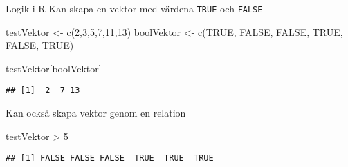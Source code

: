 \documentclass[
  10pt,
  ignorenonframetext,
]{beamer}
\newenvironment{Shaded}{\begin{snugshade}}{\end{snugshade}}
\newcommand{\ConstantTok}[1]{\textcolor[rgb]{0.00,0.00,0.00}{#1}}
\newcommand{\DecValTok}[1]{\textcolor[rgb]{0.00,0.00,0.81}{#1}}
\newcommand{\FunctionTok}[1]{\textcolor[rgb]{0.00,0.00,0.00}{#1}}
\newcommand{\NormalTok}[1]{#1}
\newcommand{\OtherTok}[1]{\textcolor[rgb]{0.56,0.35,0.01}{#1}}
\newcommand{\SpecialCharTok}[1]{\textcolor[rgb]{0.00,0.00,0.00}{#1}}
\begin{document}
\begin{frame}[fragile]{Logik i R}
\protect\hypertarget{logik-i-r}{}
Kan skapa en vektor med värdena \texttt{TRUE} och \texttt{FALSE}

\begin{Shaded}
\begin{Highlighting}[]
\NormalTok{testVektor }\OtherTok{\textless{}{-}} \FunctionTok{c}\NormalTok{(}\DecValTok{2}\NormalTok{,}\DecValTok{3}\NormalTok{,}\DecValTok{5}\NormalTok{,}\DecValTok{7}\NormalTok{,}\DecValTok{11}\NormalTok{,}\DecValTok{13}\NormalTok{)}
\NormalTok{boolVektor }\OtherTok{\textless{}{-}} \FunctionTok{c}\NormalTok{(}\ConstantTok{TRUE}\NormalTok{, }\ConstantTok{FALSE}\NormalTok{, }\ConstantTok{FALSE}\NormalTok{, }\ConstantTok{TRUE}\NormalTok{, }\ConstantTok{FALSE}\NormalTok{, }\ConstantTok{TRUE}\NormalTok{)}
\end{Highlighting}
\end{Shaded}

\begin{Shaded}
\begin{Highlighting}[]
\NormalTok{testVektor[boolVektor]}
\end{Highlighting}
\end{Shaded}

\pause

\begin{verbatim}
## [1]  2  7 13
\end{verbatim}

\pause

Kan också skapa vektor genom en relation

\begin{Shaded}
\begin{Highlighting}[]
\NormalTok{testVektor }\SpecialCharTok{\textgreater{}} \DecValTok{5}
\end{Highlighting}
\end{Shaded}

\begin{verbatim}
## [1] FALSE FALSE FALSE  TRUE  TRUE  TRUE
\end{verbatim}
\end{frame}
\end{document}
